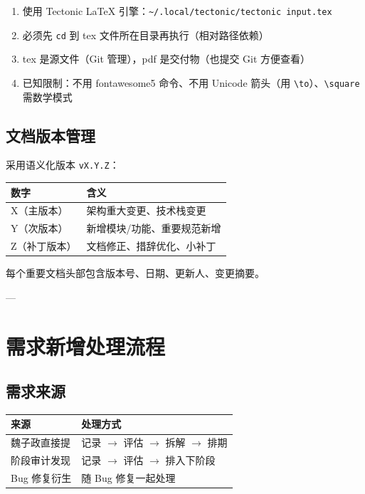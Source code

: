 \documentclass[11pt,a4paper]{article}
\begin{document}
\begin{enumerate}[nosep]
  \item 使用 Tectonic LaTeX 引擎：\texttt{\textasciitilde/.local/tectonic/tectonic input.tex}
  \item 必须先 \texttt{cd} 到 tex 文件所在目录再执行（相对路径依赖）
  \item tex 是源文件（Git 管理），pdf 是交付物（也提交 Git 方便查看）
  \item 已知限制：不用 fontawesome5 命令、不用 Unicode 箭头（用 \texttt{\textbackslash to}）、\texttt{\textbackslash square} 需数学模式
\end{enumerate}

\subsection{文档版本管理}

采用语义化版本 \texttt{vX.Y.Z}：

\begin{table}[h]
\centering
\begin{tabularx}{\linewidth}{lX}
\toprule
\textbf{数字} & \textbf{含义} \\
\midrule
X（主版本） & 架构重大变更、技术栈变更 \\
Y（次版本） & 新增模块/功能、重要规范新增 \\
Z（补丁版本） & 文档修正、措辞优化、小补丁 \\
\bottomrule
\end{tabularx}
\end{table}

每个重要文档头部包含版本号、日期、更新人、变更摘要。

---

\section{需求新增处理流程}

\subsection{需求来源}

\begin{table}[h]
\centering
\begin{tabularx}{\linewidth}{lX}
\toprule
\textbf{来源} & \textbf{处理方式} \\
\midrule
魏子政直接提 & 记录 $\to$ 评估 $\to$ 拆解 $\to$ 排期 \\
阶段审计发现 & 记录 $\to$ 评估 $\to$ 排入下阶段 \\
Bug 修复衍生 & 随 Bug 修复一起处理 \\
\bottomrule
\end{tabularx}
\end{table}
\end{document}
